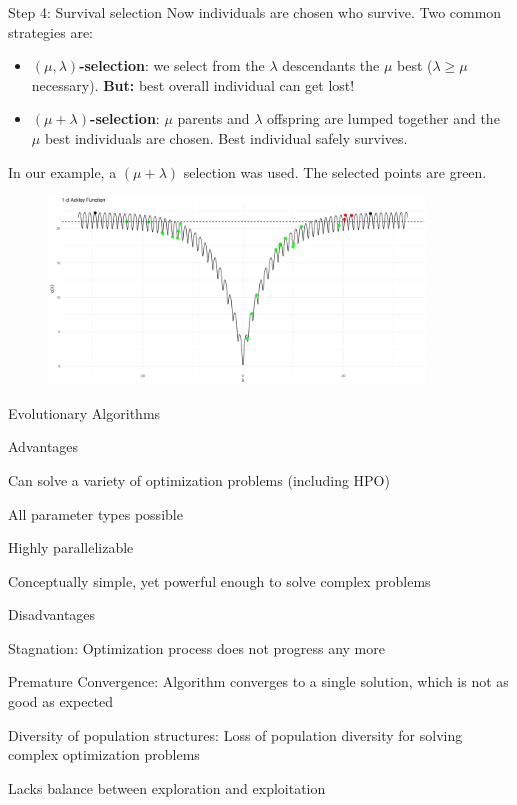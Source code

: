   \begin{frame}[allowframebreaks]{Step 4: Survival selection}
  Now individuals are chosen who survive. Two common strategies are:
  \begin{itemize}
  \item \textbf{$(\mu, \lambda)$-selection}: we select from the $\lambda$ descendants the $\mu$ best ($\lambda \ge \mu$ necessary).
  \textbf{But:} best overall individual can get lost!
  \item \textbf{$(\mu + \lambda)$-selection}: $\mu$ parents and $\lambda$ offspring are lumped together and the $\mu$ best individuals are chosen.
  Best individual safely survives.
  \end{itemize}

  \framebreak

  In our example, a $(\mu + \lambda)$ selection was used. The selected points are green.

  \begin{center}
    \begin{figure}
      \includegraphics[width=\textwidth, height=5cm]{images/ea_ex5.png}
    \end{figure}
  \end{center}

\end{frame}

\begin{frame}{Evolutionary Algorithms}

  \begin{blocki}{Advantages}
    \item Can solve a variety of optimization problems (including HPO)
    \item All parameter types possible
    \item Highly parallelizable
    \item Conceptually simple, yet powerful enough to solve complex problems
    \end{blocki}

    \begin{blocki}{Disadvantages}
    \item Stagnation: Optimization process does not progress any more %
    \item Premature Convergence: Algorithm converges to a single solution, which is not as good as expected
    \item Diversity of population structures: Loss of population diversity for solving complex optimization problems
    \item Lacks balance between exploration and exploitation
    \end{blocki}

\end{frame}

